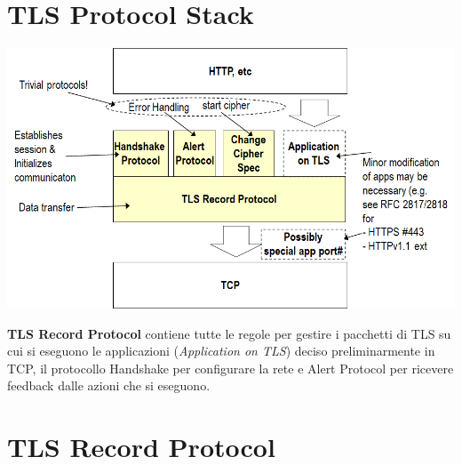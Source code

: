 \documentclass{book}
\theoremstyle{remark}
\begin{document}
\section{TLS Protocol Stack}
\begin{center}
	\includegraphics[scale=0.55]{TLSProtocolStack.png}
\end{center}
\textbf{TLS Record Protocol} contiene tutte le regole per gestire i pacchetti di TLS su cui si eseguono le applicazioni (\emph{Application on TLS}) deciso preliminarmente in TCP, il protocollo Handshake per configurare la rete e Alert Protocol per ricevere feedback dalle azioni che si eseguono\@.
\section{TLS Record Protocol}
\end{document}
